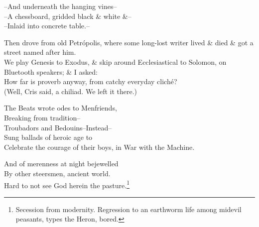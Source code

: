 --And underneath the hanging vines-- \\
--A chessboard, gridded black \& white \&-- \\
--Inlaid into concrete table.--

Then drove from old Petrópolis, where some long-lost writer lived \& died \& got a street named after him. \\
We play Genesis to Exodus, \& skip around Ecclesiastical to Solomon, on Bluetooth speakers; \& I asked: \\
How far is proverb anyway, from catchy everyday cliché? \\
(Well, Cris said, a chiliad. We left it there.)

The Beats wrote odes to Menfriends, \\
Breaking from tradition-- \\
Troubadors and Bedouins--Instead-- \\
Sung ballads of heroic age to \\
Celebrate the courage of their boys, in War with the Machine.

And of merenness at night bejewelled \\
By other steersmen, ancient world. \\
Hard to not see God herein the pasture.\footnote{Secession from modernity. Regression to an earthworm life among midevil peasants, types the Heron, bored.}